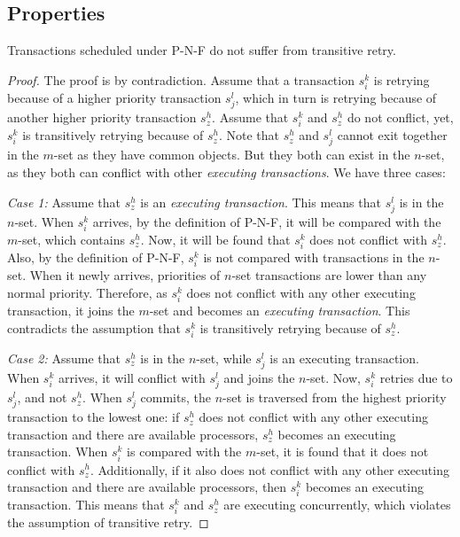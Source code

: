 \subsection{Properties\label{pnf properties sec}}

\begin{clm}\label{P-N-F-transitive-retry}
Transactions scheduled under P-N-F do not suffer from transitive
retry.
\end{clm}
\begin{proof}
The proof is by contradiction. Assume that a transaction $s_{i}^{k}$
is retrying because of a higher priority transaction $s_{j}^{l}$, which
in turn is retrying because of another higher priority transaction
$s_{z}^{h}$. Assume that $s_{i}^{k}$ and $s_{z}^{h}$ do not conflict, yet,
$s_{i}^{k}$ is transitively retrying because of $s_{z}^{h}$. 
Note that $s_{z}^{h}$ and $s_{j}^{l}$ cannot exit together in
the $m$-set as they have common objects. But they both can
exist in the $n$-set, as they both can conflict with other \emph{executing
transactions}. We have three cases:

\textit{Case 1:} Assume that $s_{z}^{h}$ is an \emph{executing transaction}. This means that $s_{j}^{l}$ is in the $n$-set. When $s_{i}^{k}$ arrives, by the definition of P-N-F, it will be compared with the $m$-set, which contains $s_{z}^{h}$. Now, it will be found that $s_{i}^{k}$ does not conflict with $s_{z}^{h}$. Also, by the definition of P-N-F, $s_{i}^{k}$ is not compared with transactions in the $n$-set. When it newly arrives, priorities of $n$-set transactions are lower than any normal priority. Therefore, as $s_{i}^{k}$ does not conflict with any other executing
transaction, it joins the $m$-set and becomes an \emph{executing
transaction}. This contradicts the assumption that $s_{i}^{k}$
is transitively retrying because of $s_{z}^{h}$.



\textit{Case 2:} Assume that $s_{z}^{h}$ is in the $n$-set, while $s_{j}^{l}$
is an executing transaction. When $s_{i}^{k}$ arrives, it will conflict
with $s_{j}^{l}$ and joins the $n$-set. Now, $s_{i}^{k}$
retries due to $s_{j}^{l}$, and not $s_{z}^{h}$. When $s_{j}^{l}$ commits,
the $n$-set is traversed from the highest priority transaction
to the lowest one: if $s_{z}^{h}$ does not conflict with any other
executing transaction and there are available processors, $s_{z}^{h}$
becomes an executing transaction. When $s_{i}^{k}$ is compared with 
the $m$-set, it is found that it does not conflict with $s_{z}^{h}$. Additionally, if it also does not conflict with any other executing transaction and there are available processors, then $s_{i}^{k}$ becomes an executing
transaction. This means that $s_{i}^{k}$ and $s_{z}^{h}$ are executing
concurrently, which violates the assumption of transitive retry.


\end{proof}
